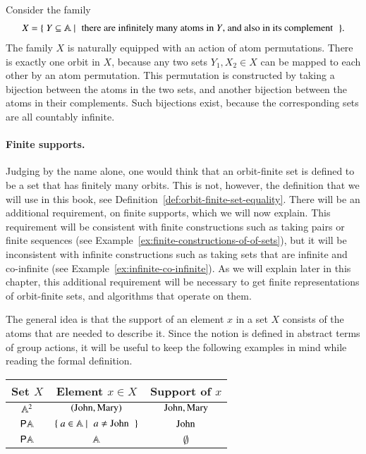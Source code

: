 \begin{myexample}
\label{ex:infinite-co-infinite}
    Consider the family 
    \begin{align*}
    X = \setbuild { Y \subseteq \atoms}{there are infinitely many atoms in $Y$, and also in its complement}.
    \end{align*}
    The family $X$ is naturally equipped with an action of atom permutations. There is exactly one orbit in $X$, because any two sets $Y_1,X_2 \in X$ can be mapped to each other  by an atom permutation. This permutation is constructed by taking a bijection between the atoms in the two sets, and another bijection between the atoms in their complements. Such bijections exist, because the corresponding sets are all countably infinite.
\end{myexample}



\paragraph*{Finite supports.} Judging by the name alone, one would think that an orbit-finite set is defined to be a set that has finitely many orbits. This is not, however, the definition that we will use in this book, see Definition~\ref{def:orbit-finite-set-equality}. There will be an additional requirement, on finite supports, which we will now explain. This requirement will be consistent with  finite constructions such as taking pairs or finite sequences (see Example~\ref{ex:finite-constructions-of-of-sets}), but it will be inconsistent with infinite constructions such as taking sets that are infinite and co-infinite (see Example~\ref{ex:infinite-co-infinite}). As we will explain later in this chapter, this additional requirement will be necessary to get finite representations of orbit-finite sets, and algorithms that operate on them.

 The general idea is that the support of an  element $x$ in a set $X$ consists of  the atoms that are needed to describe it. Since the notion is defined in abstract terms of group actions, it will be useful to keep the following examples in mind while reading the formal definition.

\begin{center}
    \begin{tabular}{c|c|c}
        Set $X$ & Element $x \in X$ & Support of $x$\\
        \hline
        $\mathbb A^2$ & $(\text{John},\text{Mary})$ & $\text{John},\text{Mary}$\\
        ${\mathsf P} \mathbb A$ & \quad  $\setbuild{a \in \atoms}{$a \neq \john$}$ \quad & $\text{John}$\\
        ${\mathsf P} \mathbb A$ & $\mathbb A$ & $\emptyset$
    \end{tabular}
\end{center}


